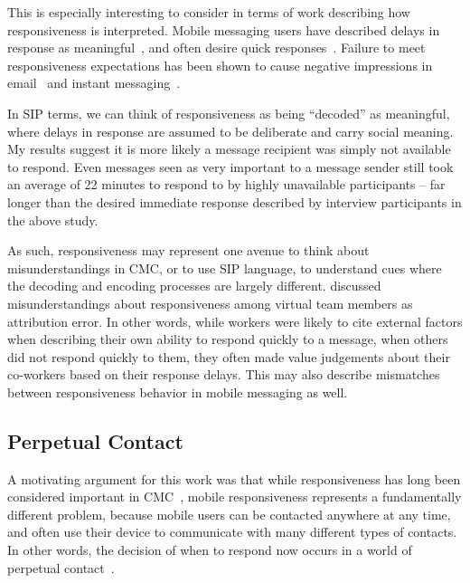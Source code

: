 \documentclass[12pt]{nuthesis}	%
\begin{document}
This is especially interesting to consider in terms of work describing how responsiveness is interpreted. Mobile messaging users have described delays in response as meaningful~\citep{rettie2009mobile}, and often desire quick responses~\citep{church2013s}. Failure to meet responsiveness expectations has been shown to cause negative impressions in email~\citep{kalman2013online} and instant messaging~\citep{heston2017worth}.

In SIP terms, we can think of responsiveness as being ``decoded'' as meaningful, where delays in response are assumed to be deliberate and carry social meaning. My results suggest it is more likely a message recipient was simply not available to respond. Even messages seen as very important to a message sender still took an average of 22 minutes to respond to by highly unavailable participants -- far longer than the desired immediate response described by interview participants in the above study.

As such, responsiveness may represent one avenue to think about misunderstandings in CMC, or to use SIP language, to understand cues where the decoding and encoding processes are largely different. \citet{cramton2002attribution} discussed misunderstandings about responsiveness among virtual team members as attribution error. In other words, while workers were likely to cite external factors when describing their own ability to respond quickly to a message, when others did not respond quickly to them, they often made value judgements about their co-workers based on their response delays. This may also describe mismatches between responsiveness behavior in mobile messaging as well.

\subsection{Perpetual Contact}

A motivating argument for this work was that while responsiveness has long been considered important in CMC~\citep[e.g.][]{avrahami2006responsiveness,dabbish2005understanding,kalman2006pauses,kalman2013online,tyler2003can,walther1995nonverbal}, mobile responsiveness represents a fundamentally different problem, because mobile users can be contacted anywhere at any time, and often use their device to communicate with many different types of contacts. In other words, the decision of when to respond now occurs in a world of perpetual contact~\citep{katz2002perpetual}.
\end{document}
